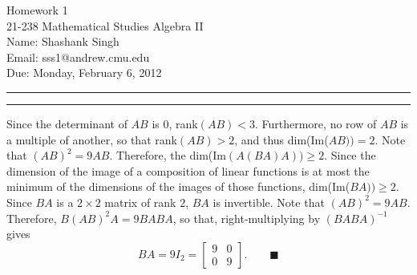 \documentclass[11pt]{article}
\makeatletter
\newcounter{questionCounter}
\newcounter{partCounter}[questionCounter]
\newenvironment{question}[2][\arabic{questionCounter}]{%
    \setcounter{partCounter}{0}%
    \vspace{.25in} \hrule \vspace{0.5em}%
        \noindent{\bf #2}%
    \vspace{0.8em} \hrule \vspace{.10in}%
    \addtocounter{questionCounter}{1}%
}{}
\newcommand{\myname}{Shashank Singh}
\newcommand{\myandrew}{sss1@andrew.cmu.edu}
\newcommand{\myclass}{21-238 Mathematical Studies Algebra II}
\newcommand{\myhwnum}{1}
\newcommand{\duedate}{Monday, February 6, 2012}
\makeatother
\begin{document}
\thispagestyle{plain}

{\Large Homework \myhwnum} \\
\myclass \\
Name: \myname \\
Email: \myandrew \\
Due: \duedate

\begin{question}{Exercise 1}
Since the determinant of $AB$ is $0$, rank$(AB) < 3$. Furthermore, no row of
$AB$ is a multiple of another, so that rank$(AB) > 2$, and thus
dim(Im($AB)) = 2$. Note that $(AB)^2 = 9AB$. Therefore, the
dim(Im$(A(BA)A)) \geq 2$. Since the dimension of the image of a composition of
linear functions is at most the minimum of the dimensions of the images of
those functions, dim(Im($BA)) \geq 2$. Since $BA$ is a $2 \times 2$ matrix of
rank $2$, $BA$ is invertible. Note that $(AB)^2 = 9AB$. Therefore,
$B(AB)^2A = 9BABA$, so that, right-multiplying by $(BABA)^{-1}$ gives
\[BA = 9I_2 = \left[\begin{array}{cc} 9 & 0 \\ 0 & 9 \end{array}\right].
\qquad \blacksquare\]
\end{question}
\end{document}
